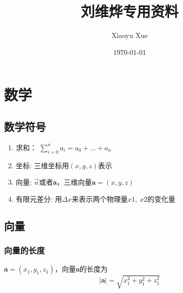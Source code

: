 \documentclass[a4paper,oneside,11pt]{article}
\title{刘维烨专用资料}
\author{Xiaoyu Xue}
\date{\today}
\newcommand{\bol}[1]{\textbf{#1}}
\begin{document}
\maketitle
\section{数学}
\subsection{数学符号}
\begin{enumerate}
	\item 求和： $\displaystyle \sum_{i = 0} ^ n a_i = a_0 + \ldots + a_n$
	\item 坐标: 三维坐标用$(x,y,z)$表示
	\item 向量: $\vec{a}$或者$\bol{a}$，三维向量$\bol{a} = (x,y,z)$
	\item 有限元差分: 用$\Delta x$来表示两个物理量$x1,~x2$的变化量
\end{enumerate}
\subsection{向量}
\subsubsection{向量的长度}
$\bol{a} = (x_1, y_1, z_1)$，向量$\bol{a}$的长度为
\begin{displaymath}
\vert \bol{a} \vert = \sqrt{x_1^2 + y_1^2 + z_1^2}
\end{displaymath}
\end{document}
